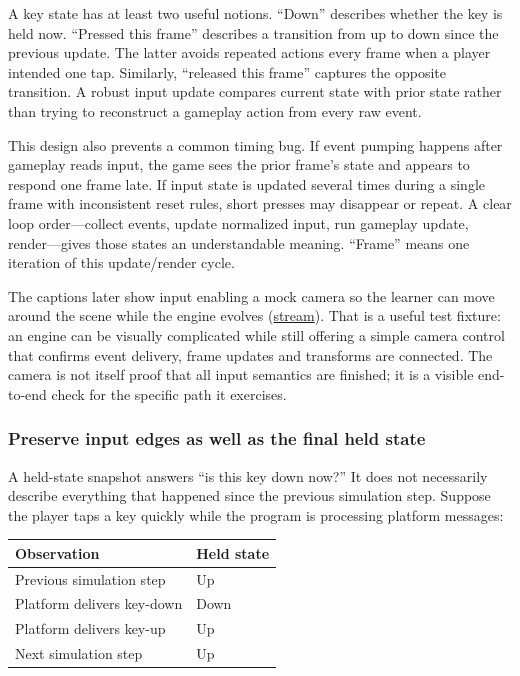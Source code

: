A key state has at least two useful notions. ``Down'' describes whether the key is held now. ``Pressed this frame'' describes a transition from up to down since the previous update. The latter avoids repeated actions every frame when a player intended one tap. Similarly, ``released this frame'' captures the opposite transition. A robust input update compares current state with prior state rather than trying to reconstruct a gameplay action from every raw event.

This design also prevents a common timing bug. If event pumping happens after gameplay reads input, the game sees the prior frame's state and appears to respond one frame late. If input state is updated several times during a single frame with inconsistent reset rules, short presses may disappear or repeat. A clear loop order---collect events, update normalized input, run gameplay update, render---gives those states an understandable meaning. ``Frame'' means one iteration of this update/render cycle.

The captions later show input enabling a mock camera so the learner can move around the scene while the engine evolves (\href{https://www.youtube.com/watch?v=s9xSwQvbG2w}{stream}). That is a useful test fixture: an engine can be visually complicated while still offering a simple camera control that confirms event delivery, frame updates and transforms are connected. The camera is not itself proof that all input semantics are finished; it is a visible end-to-end check for the specific path it exercises.

\subsubsection{Preserve input edges as well as the final held state}\label{05-engine-i-ch014-preserve-input-edges-as-well-as-the-final-held-state}

\hypertarget{05-engine-i-ch014-preserve-input-edges-as-well-as-the-final-held-state}{}

A held-state snapshot answers ``is this key down now?'' It does not necessarily describe everything that happened since the previous simulation step. Suppose the player taps a key quickly while the program is processing platform messages:

{\def\LTcaptype{none} %
\begin{longtable}[]{@{}ll@{}}
\toprule\noalign{}
Observation & Held state \\
\midrule\noalign{}
\endhead
\bottomrule\noalign{}
\endlastfoot
Previous simulation step & Up \\
Platform delivers key-down & Down \\
Platform delivers key-up & Up \\
Next simulation step & Up \\
\end{longtable}
}

